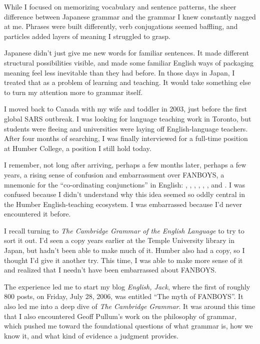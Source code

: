 While I focused on memorizing vocabulary and sentence patterns, the
sheer difference between Japanese grammar and the grammar I knew
constantly nagged at me. Phrases were built differently, verb
conjugations seemed baffling, and particles added layers of meaning I
struggled to grasp.

Japanese didn't just give me new words for familiar sentences. It made
different structural possibilities visible, and made some familiar
English ways of packaging meaning feel less inevitable than they had
before. In those days in Japan, I treated that as a problem of learning
and teaching. It would take something else to turn my attention more to
grammar itself.

I moved back to Canada with my wife and toddler in 2003, just before the
first global SARS outbreak. I was looking for language teaching work in
Toronto, but students were fleeing and universities were laying off
English-language teachers. After four months of searching, I was finally
interviewed for a full-time position at Humber College, a position I
still hold today.

I remember, not long after arriving, perhaps a few months later, perhaps
a few years, a rising sense of confusion and embarrassment over FANBOYS,
a mnemonic for the \enquote{co-ordinating conjunctions} in English:
, , , ,
, , and . I was confused because I
didn't understand why this idea seemed so oddly central in the Humber
English-teaching ecosystem. I was embarrassed because I'd never
encountered it before.

I recall turning to \textit{The Cambridge Grammar of the English
Language} to try to sort it out. I'd seen a copy years earlier at the
Temple University library in Japan, but hadn't been able to make much of
it. Humber also had a copy, so I thought I'd give it another try. This
time, I was able to make more sense of it and realized that I needn't
have been embarrassed about FANBOYS.

The experience led me to start my blog \textit{English, Jack}, where the
first of roughly 800 posts, on Friday, July 28, 2006, was entitled
\enquote{The myth of FANBOYS}. It also led me into a deep dive of
\textit{The Cambridge Grammar}. It was around this time that I also
encountered Geoff Pullum's work on the philosophy of grammar, which
pushed me toward the foundational questions of what grammar is, how we
know it, and what kind of evidence a judgment provides.

